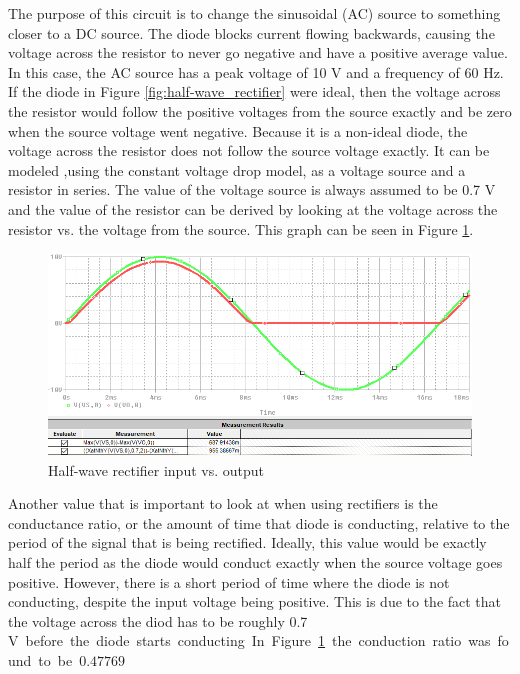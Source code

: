 \documentclass[11pt]{article}
\begin{document}
	The purpose of this circuit is to change the sinusoidal (AC) source to 
	something closer to a DC source. The diode blocks current flowing backwards, 
	causing the voltage across the resistor to never go negative and have a positive
	average value. In this case, the AC source has a peak voltage of 10 \si{\volt} and
	a frequency of 60 \si{\hertz}. If the diode in Figure \ref{fig:half-wave_rectifier}
	were ideal, then the voltage across the resistor would follow the positive voltages 
	from the source exactly and be zero when the source voltage went negative. Because
	it is a non-ideal diode, the voltage across the resistor does not follow the source 
	voltage exactly. It can be modeled ,using the constant voltage drop model, as
	a voltage source and a resistor in series. The value of the voltage source is always 
	assumed to be 0.7 \si{\volt} and the value of the resistor can be derived by looking 
	at the voltage across the resistor vs. the voltage from the source. This graph can 
	be seen in Figure \ref{fig:half-wave_rectifier_graph}.

	\begin{figure}[H]
		\centering
		\includegraphics[width=\textwidth]{half_wave_rectifier_graph.png}
		\caption{Half-wave rectifier input vs. output}
		\label{fig:half-wave_rectifier_graph}
	\end{figure}

	Another value that is important to look at when using rectifiers is the conductance
	ratio, or the amount of time that diode is conducting, relative to the period of the
	signal that is being rectified. Ideally, this value would be exactly half the period 
	as the diode would conduct exactly when the source voltage goes positive. However,
	there is a short period of time where the diode is not conducting, despite the input
	voltage being positive. This is due to the fact that the voltage across the diod has
	to be roughly 0.7 \si\volt before the diode starts conducting. In Figure 
	\ref{fig:half-wave_rectifier_graph} the conduction ratio was found to be \(0.47769\).\\
	
\end{document}
